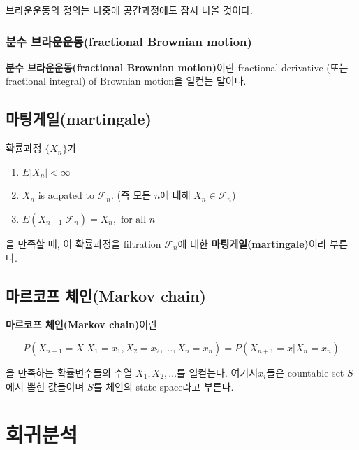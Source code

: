 \documentclass[b5paper,]{scrbook}
\theoremstyle{plain}
\theoremstyle{definition}
\numberwithin{equation}{section}
\let\BeginKnitrBlock\begin \let\EndKnitrBlock\end
\begin{document}
브라운운동의 정의는 나중에 공간과정에도 잠시 나올 것이다.

\subsection{분수 브라운운동(fractional Brownian
motion)}\label{-fractional-brownian-motion}

\textbf{분수 브라운운동(fractional Brownian motion)}이란 fractional
derivative (또는 fractional integral) of Brownian motion을 일컫는
말이다.

\section{마팅게일(martingale)}\label{martingale}

\BeginKnitrBlock{definition}[마팅게일]
\protect\hypertarget{def:unnamed-chunk-75}{}{\label{def:unnamed-chunk-75}
{} }확률과정 \(\{X_{n}\}\)가

\begin{enumerate}
\def\labelenumi{\arabic{enumi}.}
\item
  \(E |X_{n}| < \infty\)
\item
  \(X_{n}\) is adpated to \(\mathcal{F}_{n}\). (즉 모든 \(n\)에 대해
  \(X_{n}\in\mathcal{F}_{n}\))
\item
  \(E(X_{n+1}|\mathcal{F}_{n})=X_{n}, \text{ for all } n\)
\end{enumerate}

을 만족할 때, 이 확률과정을 filtration \(\mathcal{F}_{n}\)에 대한
\textbf{마팅게일(martingale)}이라 부른다.
\EndKnitrBlock{definition}

\section{마르코프 체인(Markov chain)}\label{-markov-chain}

\BeginKnitrBlock{definition}[마르코프 체인]
\protect\hypertarget{def:unnamed-chunk-76}{}{\label{def:unnamed-chunk-76}
{} }\textbf{마르코프 체인(Markov chain)}이란

\[P(X_{n+1}=X|X_{1}=x_{1}, X_{2}=x_{2}, \ldots , X_{n}=x_{n})=P(X_{n+1}=x|X_{n}=x_{n})\]

을 만족하는 확률변수들의 수열 \(X_{1},X_{2},\ldots\)를 일컫는다.
여기서\(x_{i}\)들은 countable set \(S\)에서 뽑힌 값들이며 \(S\)를 체인의
state space라고 부른다.
\EndKnitrBlock{definition}

\chapter{회귀분석}\label{reg}
\end{document}
